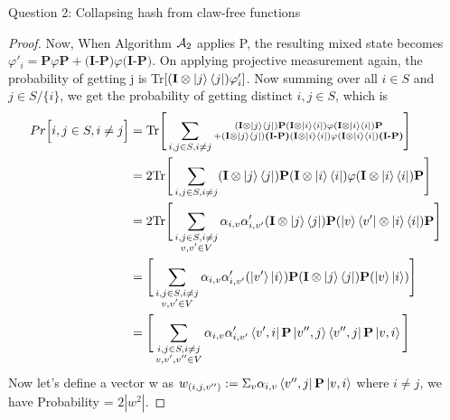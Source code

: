 \begin{solution}{Question 2: Collapsing hash from claw-free functions}
\begin{proof}
    Now, When Algorithm $\mathcal{A}_2$ applies P, the resulting mixed state becomes $\varphi'_i = \textbf{P}\varphi\textbf{P} + \textbf{(I-P)}\varphi\textbf{(I-P)}$. On applying projective measurement again, the probability of getting j is Tr$[(\textbf{I}\otimes \ket{j}\bra{j})\varphi'_i ]$. Now summing over all $i\in S$ and $j \in S/\{i\}$, we get the probability of getting distinct $i,j \in S$, which is
    \begin{equation*}
    \begin{split}
        Pr\Bigr[i,j \in S, i\neq j\Bigr] &= \text{Tr}\Bigg[\sum_{i,j\in S, i\neq j} \substack{(\textbf{I}\otimes \ket{j}\bra{j})\textbf{P}(\textbf{I}\otimes \ket{i}\bra{i})\varphi(\textbf{I}\otimes \ket{i}\bra{i})\textbf{P} \\+ (\textbf{I}\otimes \ket{j}\bra{j})\textbf{(I-P)}(\textbf{I}\otimes \ket{i}\bra{i})\varphi(\textbf{I}\otimes \ket{i}\bra{i})\textbf{(I-P)}}\Bigg]\\
        &= \text{2Tr}\Biggr[\sum_{i,j\in S, i\neq j} (\textbf{I}\otimes \ket{j}\bra{j})\textbf{P}(\textbf{I}\otimes \ket{i}\bra{i})\varphi(\textbf{I}\otimes \ket{i}\bra{i})\textbf{P}\Biggr]\\
        &= \text{2Tr} \Bigg[\sum\limits_{\substack{i,j\in S, i\neq j \\ v,v'\in V}} \alpha_{i,v}\alpha'_{i,v'}(\textbf{I}\otimes\ket{j}\bra{j})\textbf{P}(\ket{v}\bra{v'}\otimes\ket{i}\bra{i})\textbf{P}\Bigg]\\
        &= \Bigg[\sum\limits_{\substack{i,j\in S, i\neq j \\ v,v'\in V}} \alpha_{i,v}\alpha'_{i,v'} (\ket{v'}\ket{i})\textbf{P}(\textbf{I}\otimes\ket{j}\bra{j})\textbf{P}(\ket{v}\ket{i})  \Bigg]\\
        &= \Bigg[\sum\limits_{\substack{i,j\in S, i\neq j \\ v,v',v''\in V}} \alpha_{i,v}\alpha'_{i,v'}\bra{v',i}\textbf{P}\ket{v'',j}\bra{v'',j}\textbf{P}\ket{v,i} \Bigg]
    \end{split}
    \end{equation*}
    Now let's define a vector w as $w_{(i,j,v'')} := \Sigma_v \alpha_{i,v}\bra{v'',j}\textbf{P}\ket{v,i}$ where $i\neq j$, we have \newline Probability = $2 |w^2|$. 


\end{proof}
\end{solution}
